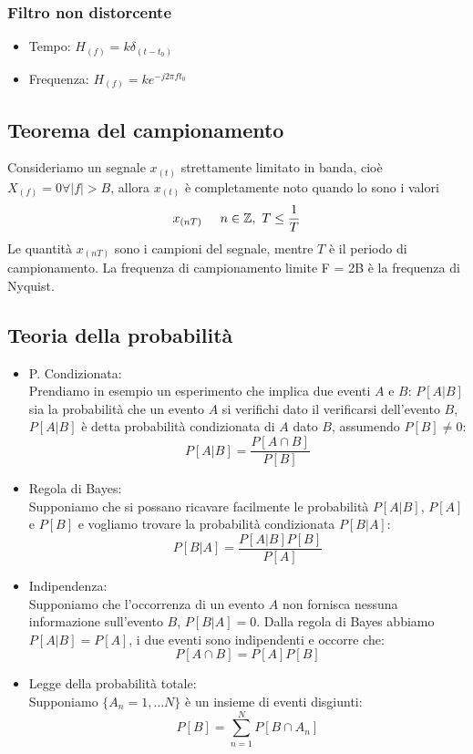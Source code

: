         \subsubsection{Filtro non distorcente}
            \begin{itemize}
                \item {Tempo: $H_{(f)} = k\delta_{(t-t_0)}$}
                \item {Frequenza: $H_{(f)} = ke^{-j2\pi ft_0}$}
            \end{itemize}
    \subsection{Teorema del campionamento}
        Consideriamo un segnale $x_{(t)}$ strettamente limitato in banda, cioè $X_{(f)} = 0 \forall |f|>B$, allora
        $x_{(t)}$ è completamente noto quando lo sono i valori
        \[
            x_{(nT)} \hspace{0.5cm} n\in\mathbb{Z},\ T\leq \frac{1}{T}  
        \]
        Le quantità $x_{(nT)}$ sono i campioni del segnale, mentre $T$ è il periodo di campionamento. La frequenza di
        campionamento limite F = 2B è la frequenza di Nyquist.

    \subsection{Teoria della probabilità}
        \begin{itemize}
            \item {P. Condizionata:\\
                Prendiamo in esempio un esperimento che implica due eventi $A$ e $B$: $P[A|B]$ sia la probabilità che un evento $A$ si verifichi
                dato il verificarsi dell'evento $B$, $P[A|B]$ è detta probabilità condizionata di $A$ dato $B$, assumendo $P[B]\neq 0$:
                \[
                    P[A|B] = \frac{P[A\cap B]}{P[B]}
                \]
            }
            \item {Regola di Bayes:\\
                Supponiamo che si possano ricavare facilmente le probabilità $P[A|B]$, $P[A]$ e $P[B]$ e vogliamo trovare la probabilità condizionata $P[B|A]$:
                \[
                    P[B|A] = \frac{P[A|B]P[B]}{P[A]}   
                \]
            }
            \item {Indipendenza:\\
                Supponiamo che l'occorrenza  di un evento $A$ non fornisca nessuna informazione sull'evento $B$, $P[B|A] = 0$. Dalla regola di Bayes abbiamo $P[A|B] = P[A]$,
                i due eventi sono indipendenti e occorre che:
                \[
                    P[A\cap B] = P[A]P[B]    
                \]
            }
            \item {Legge della probabilità totale:\\
                Supponiamo $\{ A_n = 1,\dots N\}$ è un insieme di eventi disgiunti:
                \[
                    P[B] = \sum_{n=1}^{N}P[B\cap A_n]    
                \]
            }
        \end{itemize}
